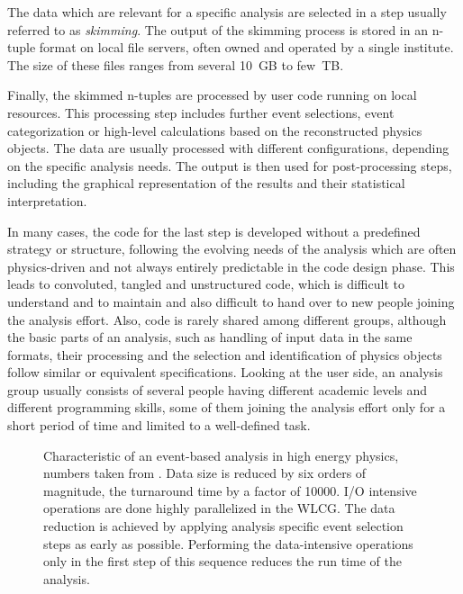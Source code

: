 \documentclass[3p]{elsarticle}
\begin{document}
The data which are relevant for a specific analysis are selected in a step usually referred to as \textit{skimming}.
The output of the skimming process is stored in an n-tuple format on local file servers, often owned and operated by a single institute.
The size of these files ranges from several \SI{10}{GB} to few~TB.

Finally, the skimmed n-tuples are processed by user code running on local resources.
This processing step includes further event selections, event categorization or high-level calculations based on the reconstructed physics objects.
The data are usually processed with different configurations, depending on the specific analysis needs.
The output is then used for post-processing steps, including the graphical representation of the results and their statistical interpretation.

In many cases, the code for the last step is developed without a predefined strategy or structure, following the evolving needs of the analysis which are often physics-driven and not always entirely predictable in the code design phase.
This leads to convoluted, tangled and unstructured code, which is difficult to understand and to maintain and also difficult to hand over to new people joining the analysis effort.
Also, code is rarely shared among different groups, although the basic parts of an analysis, such as handling of input data in the same formats, their processing and the selection and identification of physics objects follow similar or equivalent specifications.
Looking at the user side, an analysis group usually consists of several people having different academic levels and different programming skills, some of them joining the analysis effort only for a short period of time and limited to a well-defined task.

\begin{figure}[t]
\centering 
\caption[Characteristics of an event-based analysis in high energy physics]{Characteristic of an event-based analysis in high energy physics, numbers taken from \cite{joram_phd}.
Data size is reduced by six orders of magnitude, the turnaround time by a factor of 10000.
I/O intensive operations are done highly parallelized in the WLCG.
The data reduction is achieved by applying analysis specific event selection steps as early as possible.
Performing the data-intensive operations only in the first step of this sequence reduces the run time of the analysis.}
\label{figure_analysis_steps}
\end{figure}
\end{document}
